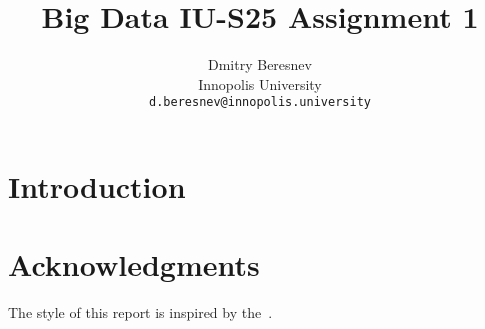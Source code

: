 \documentclass{article}
\title{Big Data IU-S25 Assignment 1}
\author{Dmitry Beresnev\\
	Innopolis University\\
	\texttt{d.beresnev@innopolis.university} \\
}
\begin{document}
\maketitle

\begin{abstract}
	\lipsum[1]
\end{abstract}



\section{Introduction}
\lipsum[2]

\section*{Acknowledgments}
The style of this report is inspired by the~\cite{uzunbayir}.




\end{document}
